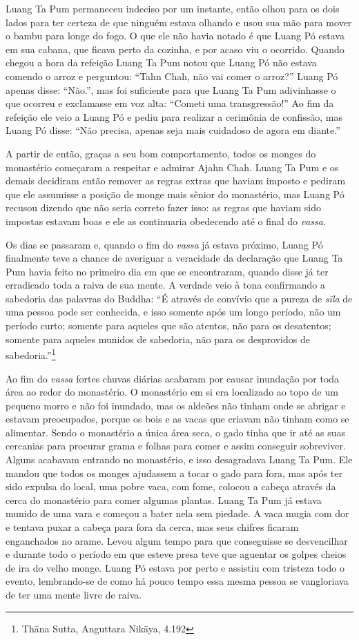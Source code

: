 Luang Ta Pum permaneceu indeciso por um instante, então olhou para os
dois lados para ter certeza de que ninguém estava olhando e usou sua mão
para mover o bambu para longe do fogo. O que ele não havia notado é que
Luang Pó estava em sua cabana, que ficava perto da cozinha, e por acaso
viu o ocorrido. Quando chegou a hora da refeição Luang Ta Pum notou que
Luang Pó não estava comendo o arroz e perguntou: ``Tahn Chah, não vai
comer o arroz?'' Luang Pó apenas disse: ``Não.'', mas foi suficiente
para que Luang Ta Pum adivinhasse o que ocorreu e exclamasse em voz
alta: ``Cometi uma transgressão!'' Ao fim da refeição ele veio a Luang
Pó e pediu para realizar a cerimônia de confissão, mas Luang Pó disse:
``Não precisa, apenas seja mais cuidadoso de agora em diante.''

A partir de então, graças a seu bom comportamento, todos os monges do
monastério começaram a respeitar e admirar Ajahn Chah. Luang Ta Pum e os
demais decidiram então remover as regras extras que haviam imposto e
pediram que ele assumisse a posição de monge mais sênior do monastério,
mas Luang Pó recusou dizendo que não seria correto fazer isso: as regras
que haviam sido impostas estavam boas e ele as continuaria obedecendo
até o final do \emph{vassa}.

Os dias se passaram e, quando o fim do \emph{vassa} já estava próximo,
Luang Pó finalmente teve a chance de averiguar a veracidade da
declaração que Luang Ta Pum havia feito no primeiro dia em que se
encontraram, quando disse já ter erradicado toda a raiva de sua mente. A
verdade veio à tona confirmando a sabedoria das palavras do Buddha: ``É
através de convívio que a pureza de \emph{sīla} de uma pessoa pode ser
conhecida, e isso somente após um longo período, não um período curto;
somente para aqueles que são atentos, não para os desatentos; somente
para aqueles munidos de sabedoria, não para os desprovidos de
sabedoria.''\footnote{Thāna Sutta, Anguttara Nikāya, 4.192}

Ao fim do \emph{vassa} fortes chuvas diárias acabaram por causar
inundação por toda área ao redor do monastério. O monastério em si era
localizado ao topo de um pequeno morro e não foi inundado, mas os
aldeões não tinham onde se abrigar e estavam preocupados, porque os bois
e as vacas que criavam não tinham como se alimentar. Sendo o monastério
a única área seca, o gado tinha que ir até as suas cercanias para
procurar grama e folhas para comer e assim conseguir sobreviver. Alguns
acabavam entrando no monastério, e isso desagradava Luang Ta Pum. Ele
mandou que todos os monges ajudassem a tocar o gado para fora, mas após
ter sido expulsa do local, uma pobre vaca, com fome, colocou a cabeça
através da cerca do monastério para comer algumas plantas. Luang Ta Pum
já estava munido de uma vara e começou a bater nela sem piedade. A vaca
mugia com dor e tentava puxar a cabeça para fora da cerca, mas seus
chifres ficaram enganchados no arame. Levou algum tempo para que
conseguisse se desvencilhar e durante todo o período em que esteve presa
teve que aguentar os golpes cheios de ira do velho monge. Luang Pó
estava por perto e assistiu com tristeza todo o evento, lembrando-se de
como há pouco tempo essa mesma pessoa se vangloriava de ter uma mente
livre de raiva.

